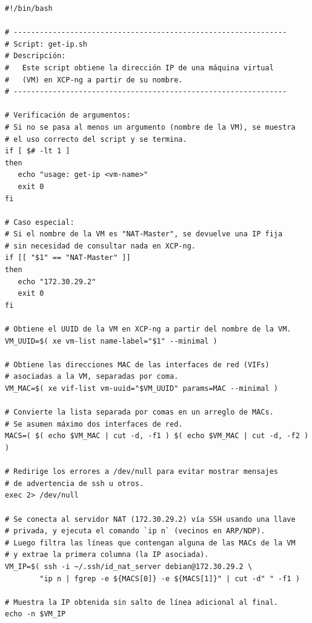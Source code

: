 \begin{verbatim}
#!/bin/bash

# ---------------------------------------------------------------
# Script: get-ip.sh
# Descripción:
#   Este script obtiene la dirección IP de una máquina virtual 
#   (VM) en XCP-ng a partir de su nombre.
# ---------------------------------------------------------------

# Verificación de argumentos:
# Si no se pasa al menos un argumento (nombre de la VM), se muestra 
# el uso correcto del script y se termina.
if [ $# -lt 1 ]
then
   echo "usage: get-ip <vm-name>"
   exit 0
fi

# Caso especial: 
# Si el nombre de la VM es "NAT-Master", se devuelve una IP fija 
# sin necesidad de consultar nada en XCP-ng.
if [[ "$1" == "NAT-Master" ]]
then
   echo "172.30.29.2"
   exit 0
fi

# Obtiene el UUID de la VM en XCP-ng a partir del nombre de la VM.
VM_UUID=$( xe vm-list name-label="$1" --minimal )

# Obtiene las direcciones MAC de las interfaces de red (VIFs) 
# asociadas a la VM, separadas por coma.
VM_MAC=$( xe vif-list vm-uuid="$VM_UUID" params=MAC --minimal )

# Convierte la lista separada por comas en un arreglo de MACs. 
# Se asumen máximo dos interfaces de red.
MACS=( $( echo $VM_MAC | cut -d, -f1 ) $( echo $VM_MAC | cut -d, -f2 ) )

# Redirige los errores a /dev/null para evitar mostrar mensajes 
# de advertencia de ssh u otros.
exec 2> /dev/null

# Se conecta al servidor NAT (172.30.29.2) vía SSH usando una llave 
# privada, y ejecuta el comando `ip n` (vecinos en ARP/NDP).
# Luego filtra las líneas que contengan alguna de las MACs de la VM 
# y extrae la primera columna (la IP asociada).
VM_IP=$( ssh -i ~/.ssh/id_nat_server debian@172.30.29.2 \
        "ip n | fgrep -e ${MACS[0]} -e ${MACS[1]}" | cut -d" " -f1 )

# Muestra la IP obtenida sin salto de línea adicional al final.
echo -n $VM_IP

\end{verbatim}

